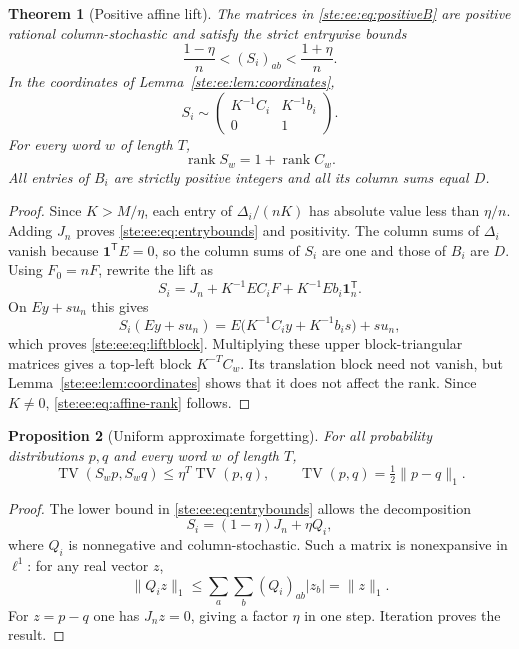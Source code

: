\documentclass[11pt,letterpaper]{article}
\newtheorem{theorem}{Theorem}[section]
\newtheorem{proposition}[theorem]{Proposition}
\theoremstyle{definition}
\theoremstyle{remark}
\newcommand{\one}{\mathbf 1}
\newcommand{\rk}{\operatorname{rank}}
\newcommand{\TV}{\operatorname{TV}}
\newcommand{\transpose}{^{\mathsf T}}
\begin{document}
\begin{theorem}[Positive affine lift]\label{ste:ee:thm:lift}
The matrices in \eqref{ste:ee:eq:positiveB} are positive rational column-stochastic and
satisfy the strict entrywise bounds
\begin{equation}
 \frac{1-\eta}{n}<(S_i)_{ab}<\frac{1+\eta}{n}.
 \label{ste:ee:eq:entrybounds}
\end{equation}
In the coordinates of Lemma~\ref{ste:ee:lem:coordinates},
\begin{equation}
 S_i\sim\begin{pmatrix}K^{-1}C_i&K^{-1}b_i\\0&1\end{pmatrix}.
 \label{ste:ee:eq:liftblock}
\end{equation}
For every word $w$ of length $T$,
\begin{equation}
 \rk S_w=1+\rk C_w.
 \label{ste:ee:eq:affine-rank}
\end{equation}
All entries of $B_i$ are strictly positive integers and all its column sums equal
$D$.
\end{theorem}
\begin{proof}
Since $K>M/\eta$, each entry of $\Delta_i/(nK)$ has absolute value less than
$\eta/n$. Adding $J_n$ proves \eqref{ste:ee:eq:entrybounds} and positivity.
The column sums of $\Delta_i$ vanish because $\one\transpose E=0$, so the column
sums of $S_i$ are one and those of $B_i$ are $D$.
Using $F_0=nF$, rewrite the lift as
\[
 S_i=J_n+K^{-1}EC_iF+K^{-1}Eb_i\one_n\transpose.
\]
On $Ey+s u_n$ this gives
\[
 S_i(Ey+s u_n)=E\bigl(K^{-1}C_i y+K^{-1}b_i s\bigr)+s u_n,
\]
which proves \eqref{ste:ee:eq:liftblock}. Multiplying these upper block-triangular
matrices gives a top-left block $K^{-T}C_w$. Its translation block need not vanish,
but Lemma~\ref{ste:ee:lem:coordinates} shows that it does not affect the rank. Since
$K\ne0$, \eqref{ste:ee:eq:affine-rank} follows.
\end{proof}

\begin{proposition}[Uniform approximate forgetting]\label{ste:ee:prop:contraction}
For all probability distributions $p,q$ and every word $w$ of length $T$,
\begin{equation}
 \TV(S_wp,S_wq)\leq\eta^T\TV(p,q),\qquad
 \TV(p,q)=\tfrac12\|p-q\|_1.
 \label{ste:ee:eq:contraction}
\end{equation}
\end{proposition}
\begin{proof}
The lower bound in \eqref{ste:ee:eq:entrybounds} allows the decomposition
\[
 S_i=(1-\eta)J_n+\eta Q_i,
\]
where $Q_i$ is nonnegative and column-stochastic. Such a matrix is nonexpansive in
$\ell^1$: for any real vector $z$,
\[
 \|Q_i z\|_1\leq\sum_a\sum_b(Q_i)_{ab}|z_b|=\|z\|_1.
\]
For $z=p-q$ one has $J_nz=0$, giving a factor $\eta$ in one step. Iteration proves
the result.
\end{proof}
\end{document}
